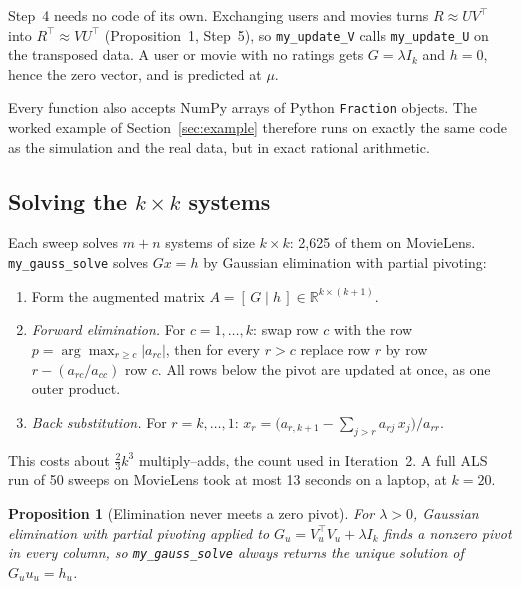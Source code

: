 \documentclass[11pt]{article}
\newtheorem{proposition}{Proposition}
\theoremstyle{definition}
\newcommand{\R}{\mathbb{R}}
\newcommand{\T}{^{\top}}
\newcommand{\code}[1]{\texttt{#1}}
\begin{document}
Step~4 needs no code of its own. Exchanging users and movies turns $R \approx UV\T$ into
$R\T \approx VU\T$ (Proposition~1, Step~5), so \code{my\_update\_V} calls \code{my\_update\_U} on
the transposed data. A user or movie with no ratings gets $G = \lambda I_k$ and $h = 0$, hence the
zero vector, and is predicted at $\mu$.

Every function also accepts NumPy arrays of Python \code{Fraction} objects. The worked example of
Section~\ref{sec:example} therefore runs on exactly the same code as the simulation and the real
data, but in exact rational arithmetic.

\subsection{\texorpdfstring{Solving the $k\times k$ systems}{Solving the k x k systems}}
\label{sec:gauss}

Each sweep solves $m + n$ systems of size $k\times k$: 2{,}625 of them on MovieLens.
\code{my\_gauss\_solve} solves $Gx = h$ by Gaussian elimination with partial pivoting:
\begin{enumerate}[leftmargin=*]
  \item Form the augmented matrix $A = [\,G \mid h\,] \in \R^{k\times(k+1)}$.
  \item \emph{Forward elimination.} For $c = 1, \dots, k$: swap row $c$ with the row
        $p = \arg\max_{r \ge c} |a_{rc}|$, then for every $r > c$ replace row $r$ by
        row $r - (a_{rc}/a_{cc})$ row $c$. All rows below the pivot are updated at once, as one
        outer product.
  \item \emph{Back substitution.} For $r = k, \dots, 1$:
        $x_r = \bigl(a_{r,k+1} - \sum_{j > r} a_{rj}\, x_j\bigr) / a_{rr}$.
\end{enumerate}
This costs about $\tfrac23 k^3$ multiply--adds, the count used in Iteration~2. A full ALS run of
50 sweeps on MovieLens took at most 13 seconds on a laptop, at $k = 20$.

\begin{proposition}[Elimination never meets a zero pivot]
\label{prop:pivot}
For $\lambda > 0$, Gaussian elimination with partial pivoting applied to
$G_u = V_u\T V_u + \lambda I_k$ finds a nonzero pivot in every column, so \code{my\_gauss\_solve}
always returns the unique solution of $G_u u_u = h_u$.
\end{proposition}
\end{document}
